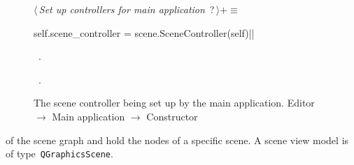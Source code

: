\documentclass[%
    a4paper,    %
    justified,  %
    nobib,      %
    openany     %
]{tufte-book}
\makeatletter
\renewcommand{\label}[1]{\@tufte@label{##1}}%
\makeatother
\begin{document}
\begin{figure}
\begin{flushleft} \small
\begin{minipage}{\linewidth}\label{scrap88}\raggedright\small
{} $\langle\,${\itshape Set up controllers for main application}\nobreak\ {\footnotesize {?}}$\,\rangle+\equiv$
\vspace{-1ex}
\begin{pythoncode}
self.scene_controller = scene.SceneController(self)|\NWsep|
\end{pythoncode}
\vspace{1.5ex}
\footnotesize
\begin{list}{}{\setlength{\itemsep}{-\parsep}\setlength{\itemindent}{-\leftmargin}}
\item \NWtxtMacroDefBy\ .
\item \NWtxtMacroRefIn\ .

\item{}
\end{list}
\end{minipage}\vspace{4ex}
\end{flushleft}
\caption{The scene controller being set up by the main application.
  \newline{}\newline{}Editor $\rightarrow$ Main application $\rightarrow$
  Constructor}
\label{editor:lst:main-application:constructor:setup-scene-controller}
\end{figure}

 of the scene graph
and hold the nodes of a specific scene. A scene view model is of
type~\verb=QGraphicsScene=.
\end{document}
